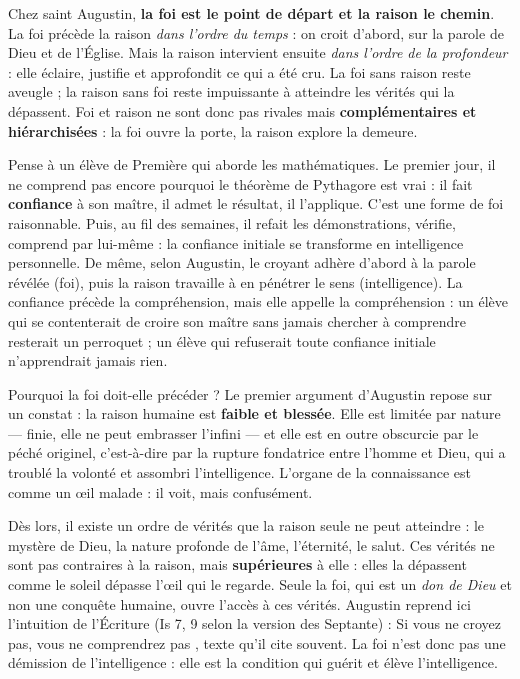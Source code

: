 \documentclass[11pt]{article}
\newcommand{\cle}[1]{{\popxbold\color{popdark}#1}}
\newcounter{popsec}
\newcounter{popsub}
\newcommand{\courssub}[1]{%
  \stepcounter{popsub}%
  \par\vspace{9pt}\noindent{\popxbold\fontsize{11.5}{13}\selectfont\color{popink}{\color{poporange}\thepopsec.\thepopsub}\hspace{6pt}#1}\par\nopagebreak\vspace{4pt}
}
\begin{document}
\begin{propriete}
Chez saint Augustin, \textbf{la foi est le point de départ et la raison le chemin}. La foi précède la raison \emph{dans l'ordre du temps} : on croit d'abord, sur la parole de Dieu et de l'Église. Mais la raison intervient ensuite \emph{dans l'ordre de la profondeur} : elle éclaire, justifie et approfondit ce qui a été cru. La foi sans raison reste aveugle ; la raison sans foi reste impuissante à atteindre les vérités qui la dépassent. Foi et raison ne sont donc pas rivales mais \textbf{complémentaires et hiérarchisées} : la foi ouvre la porte, la raison explore la demeure.
\end{propriete}

\begin{exemplebox}
Pense à un élève de Première qui aborde les mathématiques. Le premier jour, il ne comprend pas encore pourquoi le théorème de Pythagore est vrai : il fait \textbf{confiance} à son maître, il admet le résultat, il l'applique. C'est une forme de foi raisonnable. Puis, au fil des semaines, il refait les démonstrations, vérifie, comprend par lui-même : la confiance initiale se transforme en intelligence personnelle. De même, selon Augustin, le croyant adhère d'abord à la parole révélée (foi), puis la raison travaille à en pénétrer le sens (intelligence). La confiance précède la compréhension, mais elle appelle la compréhension : un élève qui se contenterait de croire son maître sans jamais chercher à comprendre resterait un perroquet ; un élève qui refuserait toute confiance initiale n'apprendrait jamais rien.
\end{exemplebox}

\courssub{Premier argument : la faiblesse de la raison humaine}

Pourquoi la foi doit-elle précéder ? Le premier argument d'Augustin repose sur un constat : la raison humaine est \textbf{faible et blessée}. Elle est limitée par nature — finie, elle ne peut embrasser l'infini — et elle est en outre obscurcie par le \cle{péché originel}, c'est-à-dire par la rupture fondatrice entre l'homme et Dieu, qui a troublé la volonté et assombri l'intelligence. L'organe de la connaissance est comme un œil malade : il voit, mais confusément.

Dès lors, il existe un ordre de vérités que la raison seule ne peut atteindre : le mystère de Dieu, la nature profonde de l'âme, l'éternité, le salut. Ces vérités ne sont pas contraires à la raison, mais \textbf{supérieures} à elle : elles la dépassent comme le soleil dépasse l'œil qui le regarde. Seule la foi, qui est un \emph{don de Dieu} et non une conquête humaine, ouvre l'accès à ces vérités. Augustin reprend ici l'intuition de l'Écriture (Is 7, 9 selon la version des Septante) : \guillemotleft Si vous ne croyez pas, vous ne comprendrez pas \guillemotright, texte qu'il cite souvent. La foi n'est donc pas une démission de l'intelligence : elle est la condition qui guérit et élève l'intelligence.
\end{document}
